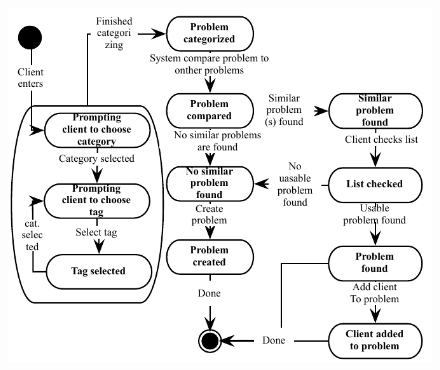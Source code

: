 \begin{figure}[htbp]
\begin{center}
 \includegraphics[scale=0.8]{input/application_domain_analysis/submit_problem_use_case}
\label{fig:submit_problem_use_case}
\end{center}
\end{figure}



